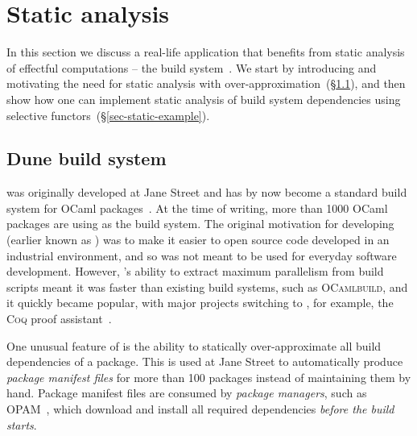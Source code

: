 \section{Static analysis}\label{sec-static}

In this section we discuss a real-life application that benefits from static
analysis of effectful computations -- the \Dune build system~\citep{dune}. We
start by introducing \Dune and motivating the need for static analysis with
over-approximation~(\S\ref{sec-dune-intro}), and then show how one can implement
static analysis of build system dependencies using selective
functors~(\S\ref{sec-static-example}).

\subsection{Dune build system}\label{sec-dune-intro}

\Dune was originally developed at Jane Street and has by now become a standard
build system for OCaml packages~\citep{dune}. At the time of writing, more than
1000 OCaml packages are using \Dune as the build system. The original motivation
for developing \Dune (earlier known as ) was to make it easier
to open source code developed in an industrial environment, and so \Dune was not
meant to be used for everyday software development. However, \Dune's ability to
extract maximum parallelism from build scripts meant it was faster than existing
build systems, such as \textsc{OCamlbuild}, and it quickly became popular, with
major projects switching to \Dune, for example, the \textsc{Coq} proof
assistant~\citep{bertot2013coq}.


One unusual feature of \Dune is the ability to statically
over-approximate all build dependencies of a package. This is used at
Jane Street to automatically produce \emph{package manifest files} for
more than 100 packages instead of maintaining them by hand. Package
manifest files are consumed by \emph{package managers}, such as
OPAM~\citep{opam}, which download and install all required dependencies
\emph{before the build starts}.


